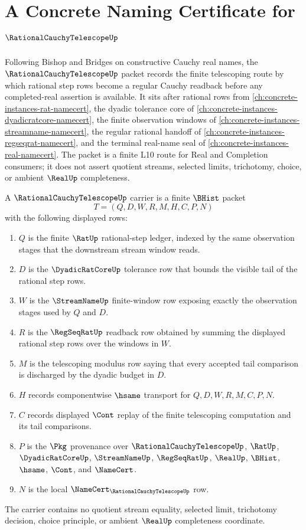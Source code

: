 \chapter{A Concrete Naming Certificate for $\RationalCauchyTelescopeUp$}
\label{ch:concrete-instances-rational-cauchy-telescope-namecert}

Following Bishop and Bridges on constructive Cauchy real names, the $\RationalCauchyTelescopeUp$ packet records the finite telescoping route by which rational step rows become a regular Cauchy readback before any completed-real assertion is available. It sits after rational rows from \autoref{ch:concrete-instances-rat-namecert}, the dyadic tolerance core of \autoref{ch:concrete-instances-dyadicratcore-namecert}, the finite observation windows of \autoref{ch:concrete-instances-streamname-namecert}, the regular rational handoff of \autoref{ch:concrete-instances-regseqrat-namecert}, and the terminal real-name seal of \autoref{ch:concrete-instances-real-namecert}. The packet is a finite L10 route for Real and Completion consumers; it does not assert quotient streams, selected limits, trichotomy, choice, or ambient $\RealUp$ completeness.

\begin{definition}
\label{def:rational-cauchy-telescope-carrier}
A $\RationalCauchyTelescopeUp$ carrier is a finite $\BHist$ packet
$$
T=(Q,D,W,R,M,H,C,P,N)
$$
with the following displayed rows:
\begin{enumerate}
\item $Q$ is the finite $\RatUp$ rational-step ledger, indexed by the same observation stages that the downstream stream window reads.
\item $D$ is the $\DyadicRatCoreUp$ tolerance row that bounds the visible tail of the rational step rows.
\item $W$ is the $\StreamNameUp$ finite-window row exposing exactly the observation stages used by $Q$ and $D$.
\item $R$ is the $\RegSeqRatUp$ readback row obtained by summing the displayed rational step rows over the windows in $W$.
\item $M$ is the telescoping modulus row saying that every accepted tail comparison is discharged by the dyadic budget in $D$.
\item $H$ records componentwise $\hsame$ transport for $Q,D,W,R,M,C,P,N$.
\item $C$ records displayed $\Cont$ replay of the finite telescoping computation and its tail comparisons.
\item $P$ is the $\Pkg$ provenance over $\RationalCauchyTelescopeUp$, $\RatUp$, $\DyadicRatCoreUp$, $\StreamNameUp$, $\RegSeqRatUp$, $\RealUp$, $\BHist$, $\hsame$, $\Cont$, and $\NameCert$.
\item $N$ is the local $\NameCert_{\RationalCauchyTelescopeUp}$ row.
\end{enumerate}
The carrier contains no quotient stream equality, selected limit, trichotomy decision, choice principle, or ambient $\RealUp$ completeness coordinate.
\end{definition}

